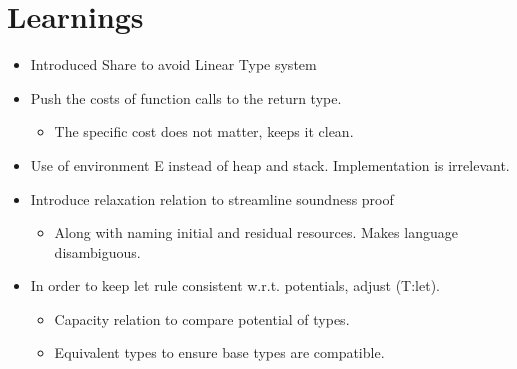 \chapter{Learnings}
\begin{itemize}
	\item Introduced Share to avoid Linear Type system
	\item Push the costs of function calls to the return type. 
	   \begin{itemize}
	   	\item The specific cost does not matter, keeps it clean.
	   \end{itemize}
	\item Use of environment E instead of heap and stack. Implementation is irrelevant.
	\item Introduce relaxation relation to streamline soundness proof
	\begin{itemize}
		\item Along with naming initial and residual resources. Makes language disambiguous.
	\end{itemize}
\item In order to keep let rule consistent w.r.t. potentials, adjust (T:let). 
	\begin{itemize}
		\item Capacity relation to compare potential of types.
		\item Equivalent types to ensure base types are compatible.
	\end{itemize}
\end{itemize}
